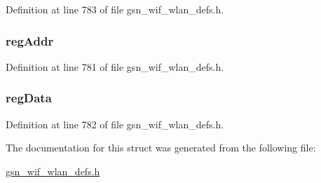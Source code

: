 Definition at line 783 of file gsn\_\-wif\_\-wlan\_\-defs.h.

\hypertarget{a00390_a1fb4766127cb7479ec14c3e966c18377}{
\subsubsection[{regAddr}]{ {\bf regAddr}}}
\label{a00390_a1fb4766127cb7479ec14c3e966c18377}


Definition at line 781 of file gsn\_\-wif\_\-wlan\_\-defs.h.

\hypertarget{a00390_aded5749b9f4991158fd95a242386d34e}{
\subsubsection[{regData}]{ {\bf regData}}}
\label{a00390_aded5749b9f4991158fd95a242386d34e}


Definition at line 782 of file gsn\_\-wif\_\-wlan\_\-defs.h.



The documentation for this struct was generated from the following file:\begin{DoxyCompactItemize}
\item 
\hyperlink{a00613}{gsn\_\-wif\_\-wlan\_\-defs.h}\end{DoxyCompactItemize}
